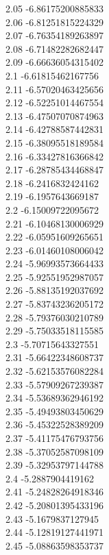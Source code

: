 {2.05	-6.86175200885833\\
2.06	-6.81251815224329\\
2.07	-6.76354189263897\\
2.08	-6.71482282682447\\
2.09	-6.66636054315402\\
2.1	-6.61815462167756\\
2.11	-6.57020463425656\\
2.12	-6.52251014467554\\
2.13	-6.47507070874963\\
2.14	-6.42788587442831\\
2.15	-6.38095518189584\\
2.16	-6.33427816366842\\
2.17	-6.28785434468847\\
2.18	-6.2416832424162\\
2.19	-6.1957643669187\\
2.2	-6.15009722095672\\
2.21	-6.10468130006929\\
2.22	-6.05951609265651\\
2.23	-6.01460108006042\\
2.24	-5.96993573664433\\
2.25	-5.92551952987057\\
2.26	-5.88135192037692\\
2.27	-5.83743236205172\\
2.28	-5.79376030210789\\
2.29	-5.75033518115585\\
2.3	-5.70715643327551\\
2.31	-5.66422348608737\\
2.32	-5.62153576082284\\
2.33	-5.57909267239387\\
2.34	-5.53689362946192\\
2.35	-5.49493803450629\\
2.36	-5.45322528389209\\
2.37	-5.41175476793756\\
2.38	-5.37052587098109\\
2.39	-5.32953797144788\\
2.4	-5.2887904419162\\
2.41	-5.24828264918346\\
2.42	-5.20801395433196\\
2.43	-5.1679837127945\\
2.44	-5.12819127441971\\
2.45	-5.08863598353737\\
}
